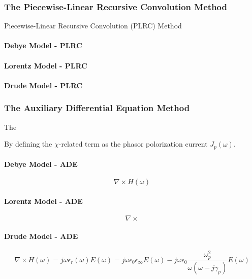 \subsubsection{The Piecewise-Linear Recursive Convolution Method}
Piecewise-Linear Recursive Convolution (PLRC) Method

\paragraph{{\msjh Debye Model - PLRC}}

\paragraph{{\msjh Lorentz Model - PLRC}}

\paragraph{{\msjh Drude Model - PLRC}}

\subsubsection{The Auxiliary Differential Equation Method}
The 

By defining the $\chi$-related term as the phasor polorization current $J_p(\omega)$.
\paragraph{{\msjh Debye Model - ADE}}
\begin{displaymath}
  \nabla \times H(\omega)
\end{displaymath}

\paragraph{{\msjh Lorentz Model - ADE}}
\begin{displaymath}
  \nabla \times
\end{displaymath}

\paragraph{{\msjh Drude Model - ADE}}
\begin{displaymath}
    \nabla \times H(\omega) = j\omega \epsilon_r(\omega)E(\omega) = j\omega\epsilon_0 \epsilon_{\infty} E(\omega) - j\omega\epsilon_0\frac{\omega_p^2}{\omega(\omega-j\gamma_p)}E(\omega)
\end{displaymath}

